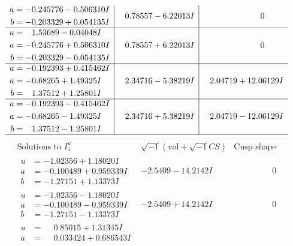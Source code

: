 \documentclass[1p]{elsarticle_modified}
\theoremstyle{definition}
\newcommand{\I}{\sqrt{-1}}
\begin{document}
$$\begin{array}{c|c|c}
\begin{aligned}
a &= -0.245776 - 0.506310 I \\
b &= -0.203329 + 0.054135 I\end{aligned}
 & \phantom{-}0.78557 - 6.22013 I & \phantom{-0.000000 } 0 \\ \hline\begin{aligned}
u &= \phantom{-}1.53689 - 0.04048 I \\
a &= -0.245776 + 0.506310 I \\
b &= -0.203329 - 0.054135 I\end{aligned}
 & \phantom{-}0.78557 + 6.22013 I & \phantom{-0.000000 } 0 \\ \hline\begin{aligned}
u &= -0.192393 + 0.415462 I \\
a &= -0.68265 + 1.49325 I \\
b &= \phantom{-}1.37512 + 1.25801 I\end{aligned}
 & \phantom{-}2.34716 - 5.38219 I & \phantom{-}2.04719 + 12.06129 I \\ \hline\begin{aligned}
u &= -0.192393 - 0.415462 I \\
a &= -0.68265 - 1.49325 I \\
b &= \phantom{-}1.37512 - 1.25801 I\end{aligned}
 & \phantom{-}2.34716 + 5.38219 I & \phantom{-}2.04719 - 12.06129 I\\
 \hline 
 \end{array}$$\newpage$$\begin{array}{c|c|c}  
\text{Solutions to }I^u_{1}& \I (\text{vol} + \sqrt{-1}CS) & \text{Cusp shape}\\
 \hline 
\begin{aligned}
u &= -1.02356 + 1.18020 I \\
a &= -0.100489 + 0.959339 I \\
b &= -1.27151 + 1.13373 I\end{aligned}
 & -2.5409 - 14.2142 I & \phantom{-0.000000 } 0 \\ \hline\begin{aligned}
u &= -1.02356 - 1.18020 I \\
a &= -0.100489 - 0.959339 I \\
b &= -1.27151 - 1.13373 I\end{aligned}
 & -2.5409 + 14.2142 I & \phantom{-0.000000 } 0 \\ \hline\begin{aligned}
u &= \phantom{-}0.85015 + 1.31345 I \\
a &= \phantom{-}0.033424 + 0.686543 I \\

\end{aligned}
\end{array}$$
\end{document}
